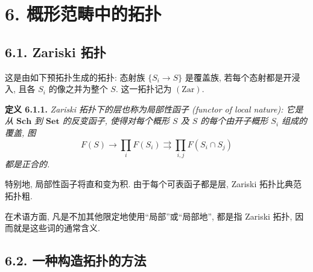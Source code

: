
\section*{6. 概形范畴中的拓扑}

\subsection*{6.1. Zariski 拓扑}

这是由如下预拓扑生成的拓扑: 态射族 \(\{S_i\to S\}\) 是覆盖族,
若每个态射都是开浸入, 且各 \(S_i\) 的像之并为整个 \(S\).
这一拓扑记为 \((\mathrm{Zar})\).

\medskip
\noindent{}\textbf{定义 6.1.1.}
\textit{Zariski 拓扑下的层也称为\emph{局部性函子 (functor of local nature)}:
它是从 \(\mathbf{Sch}\) 到 \(\mathbf{Set}\) 的反变函子,
使得对每个概形 \(S\) 及 \(S\) 的每个由开子概形 \(S_i\) 组成的覆盖, 图}
\[
  F(S)\longrightarrow\prod_iF(S_i)
  \rightrightarrows\prod_{i,j}F(S_i\cap S_j)
\]
\textit{都是正合的.}

特别地, 局部性函子将直和变为积.
由于每个可表函子都是层, Zariski 拓扑比典范拓扑粗.

在术语方面, 凡是不加其他限定地使用“局部”或“局部地”, 都是指 Zariski 拓扑,
因而就是这些词的通常含义.

\subsection*{6.2. 一种构造拓扑的方法}

